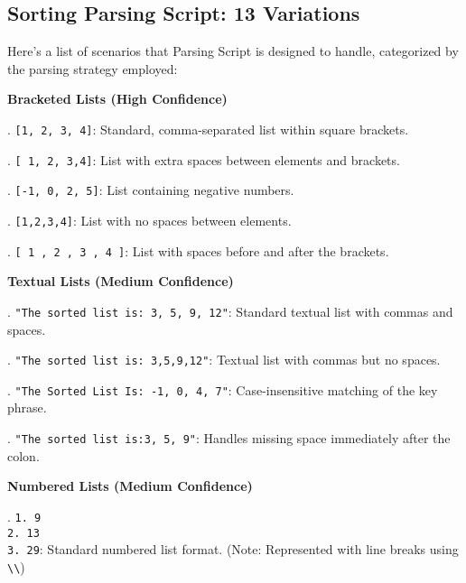 

\subsection{Sorting Parsing Script: 13 Variations}
\label{app: Sorting Parsing Script: 13 Variations}

Here's a list of scenarios that Parsing Script is designed to handle, categorized by the parsing strategy employed:

\vspace{0.5em}

\noindent \textbf{Bracketed Lists (High Confidence)}
\vspace{0.2em}

. \texttt{[1, 2, 3, 4]}: Standard, comma-separated list within square brackets.

. \texttt{[ 1,  2, 3,4]}: List with extra spaces between elements and brackets.

. \texttt{[-1, 0, 2, 5]}: List containing negative numbers.

. \texttt{[1,2,3,4]}: List with no spaces between elements.

. \texttt{[ 1 , 2 , 3 , 4 ]}: List with spaces before and after the brackets.

\vspace{0.5em}

\noindent \textbf{Textual Lists (Medium Confidence)}
\vspace{0.2em}

. \texttt{"The sorted list is: 3, 5, 9, 12"}: Standard textual list with commas and spaces.

. \texttt{"The sorted list is: 3,5,9,12"}: Textual list with commas but no spaces.

. \texttt{"The Sorted List Is: -1, 0, 4, 7"}: Case-insensitive matching of the key phrase.

. \texttt{"The sorted list is:3, 5, 9"}: Handles missing space immediately after the colon.

\vspace{0.5em}

\noindent \textbf{Numbered Lists (Medium Confidence)}
\vspace{0.2em}

. \texttt{1. 9\\2. 13\\3. 29}: Standard numbered list format.  (Note: Represented with line breaks using \texttt{\textbackslash\textbackslash})

